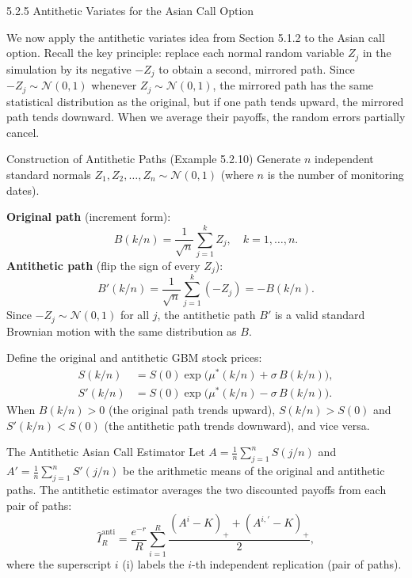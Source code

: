 \documentclass[aspectratio=169,10pt]{beamer}
\begin{document}
\begin{frame}[allowframebreaks]{5.2.5 Antithetic Variates for the Asian Call Option}

We now apply the antithetic variates idea from Section 5.1.2 to the Asian call
option.  Recall the key principle: replace each normal random variable $Z_j$ in
the simulation by its negative $-Z_j$ to obtain a second, mirrored path.  Since
$-Z_j \sim \mathcal{N}(0,1)$ whenever $Z_j \sim \mathcal{N}(0,1)$, the mirrored
path has the same statistical distribution as the original, but if one path tends
upward, the mirrored path tends downward.  When we average their payoffs, the
random errors partially cancel.

\begin{block}{Construction of Antithetic Paths (Example 5.2.10)}
  Generate $n$ independent standard normals $Z_1, Z_2, \ldots, Z_n \sim \mathcal{N}(0,1)$
  (where $n$ is the number of monitoring dates).

  \textbf{Original path} (increment form):
  \[
    B(k/n) = \frac{1}{\sqrt{n}}\sum_{j=1}^k Z_j, \quad k = 1, \ldots, n.
  \]
  \textbf{Antithetic path} (flip the sign of every $Z_j$):
  \[
    B'(k/n) = \frac{1}{\sqrt{n}}\sum_{j=1}^k (-Z_j) = -B(k/n).
  \]
  Since $-Z_j \sim \mathcal{N}(0,1)$ for all $j$, the antithetic path $B'$ is
  a valid standard Brownian motion with the same distribution as $B$.

  Define the original and antithetic GBM stock prices:
  \begin{align*}
    S(k/n)  &= S(0)\exp\!\bigl(\mu^*(k/n) + \sigma\,B(k/n)\bigr), \\
    S'(k/n) &= S(0)\exp\!\bigl(\mu^*(k/n) - \sigma\,B(k/n)\bigr).
  \end{align*}
  When $B(k/n) > 0$ (the original path trends upward), $S(k/n) > S(0)$ and
  $S'(k/n) < S(0)$ (the antithetic path trends downward), and vice versa.
\end{block}

\framebreak

\begin{block}{The Antithetic Asian Call Estimator}
  Let $A = \frac{1}{n}\sum_{j=1}^n S(j/n)$ and
  $A' = \frac{1}{n}\sum_{j=1}^n S'(j/n)$ be the arithmetic means of the
  original and antithetic paths.  The antithetic estimator averages the two
  discounted payoffs from each pair of paths:
  \[
    \hat{I}_R^{\mathrm{anti}} = \frac{e^{-r}}{R}\sum_{i=1}^R
    \frac{(A^i - K)_+ + (A^{i,\prime} - K)_+}{2},
  \]
  where the superscript $i$ (i) labels the $i$-th independent replication
  (pair of paths).


\end{block}
\end{frame}
\end{document}
